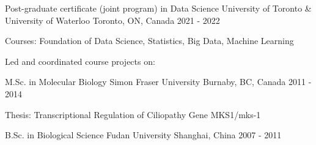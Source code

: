 


\begin{cventries}

\cventry
{Post-graduate certificate (joint program) in Data Science} %
{University of Toronto \& University of Waterloo} %
{Toronto, ON, Canada} %
{2021 - 2022} %
{ %
\begin{cvitems}
	\item {Courses: Foundation of Data Science, Statistics, Big Data, Machine Learning}
	\item {Led and coordinated course projects on:
	}
\end{cvitems}
}

\cventry
{M.Sc. in Molecular Biology} %
{Simon Fraser University} %
{Burnaby, BC, Canada} %
{2011 - 2014} %
{ %
\begin{cvitems}
	\item {Thesis: Transcriptional Regulation of Ciliopathy Gene MKS1/mks-1}
\end{cvitems}
}

\cventry
{B.Sc. in Biological Science}
{Fudan University}
{Shanghai, China}
{2007 - 2011}
{}

\end{cventries}